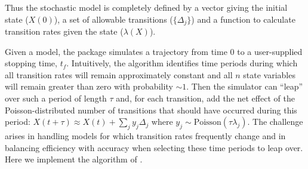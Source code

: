 \documentclass[11pt,nogin]{article}
\begin{document}
Thus the stochastic model is completely defined by a vector giving the initial state ($X(0)$), a set of allowable transitions ($\{\Delta_{j}\}$) and a function to calculate transition rates given the state ($\lambda(X)$).

Given a model, the package simulates a trajectory from time 0 to a user-supplied stopping time, $t_{f}$. Intuitively, the algorithm identifies time periods during which all transition rates will remain approximately constant and all $n$ state variables will remain greater than zero with probability $\sim1$. Then the simulator can ``leap'' over such a period of length $\tau$ and, for each transition, add the net effect of the Poisson-distributed number of transitions that should have occurred during this period: $X(t+\tau)\approx X(t)+\sum_{j}y_{j}\Delta_{j}$ where $y_{j}\sim\mbox{Poisson}(\tau\lambda_{j})$. The challenge arises in handling models for which transition rates frequently change and in balancing efficiency with accuracy when selecting these time periods to leap over. Here we implement the algorithm of \citet{CGP07}.
\end{document}
